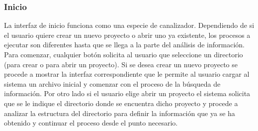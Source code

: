 \subsubsection{Inicio}{
\noindent La interfaz de inicio funciona como una especie de canalizador. Dependiendo de si el usuario quiere crear un nuevo proyecto o abrir uno ya existente, los procesos a ejecutar son diferentes hasta que se llega a la parte del análisis de información. Para comenzar, cualquier botón solicita al usuario que seleccione un directorio (para crear o para abrir un proyecto). Si se desea crear un nuevo proyecto se procede a mostrar la interfaz correspondiente que le permite al usuario cargar al sistema un archivo inicial y comenzar con el proceso de la búsqueda de información. Por otro lado si el usuario elige abrir un proyecto el sistema solicita que se le indique el directorio donde se encuentra dicho proyecto y procede a analizar la estructura del directorio para definir la información que ya se ha obtenido y continuar el proceso desde el punto necesario.\\
}
